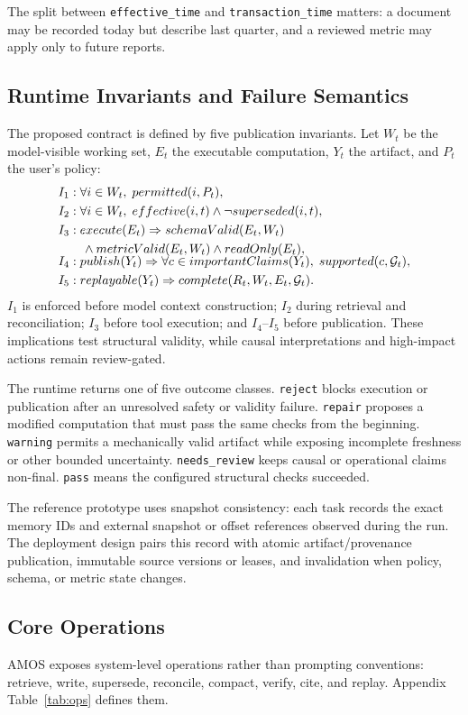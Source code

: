 \documentclass[sigconf,nonacm]{acmart}
\newcommand{\amos}{\textsc{AMOS}\xspace}
\newcommand{\prov}{\mathcal{G}}
\newcommand{\code}[1]{\texttt{#1}}
\begin{document}
The split between \code{effective\_time} and \code{transaction\_time} matters: a document may be recorded today but describe last quarter, and a reviewed metric may apply only to future reports.

\subsection{Runtime Invariants and Failure Semantics}
The proposed contract is defined by five publication invariants. Let $W_t$ be the model-visible working set, $E_t$ the executable computation, $Y_t$ the artifact, and $P_t$ the user's policy:
\begin{align}
I_1 &: \forall i \in W_t,\; permitted(i,P_t), \\
I_2 &: \forall i \in W_t,\; effective(i,t) \land \neg superseded(i,t), \\
I_3 &: execute(E_t) \Rightarrow schemaValid(E_t,W_t) \\
    &\quad \land metricValid(E_t,W_t) \land readOnly(E_t), \notag\\[-1.2ex]
I_4 &: publish(Y_t) \Rightarrow \forall c \in importantClaims(Y_t),\; supported(c,\prov_t), \\
I_5 &: replayable(Y_t) \Rightarrow complete(R_t,W_t,E_t,\prov_t).
\end{align}
$I_1$ is enforced before model context construction; $I_2$ during retrieval and reconciliation; $I_3$ before tool execution; and $I_4$--$I_5$ before publication. These implications test structural validity, while causal interpretations and high-impact actions remain review-gated.

The runtime returns one of five outcome classes. \code{reject} blocks execution or publication after an unresolved safety or validity failure. \code{repair} proposes a modified computation that must pass the same checks from the beginning. \code{warning} permits a mechanically valid artifact while exposing incomplete freshness or other bounded uncertainty. \code{needs\_review} keeps causal or operational claims non-final. \code{pass} means the configured structural checks succeeded.

The reference prototype uses snapshot consistency: each task records the exact memory IDs and external snapshot or offset references observed during the run. The deployment design pairs this record with atomic artifact/provenance publication, immutable source versions or leases, and invalidation when policy, schema, or metric state changes.

\subsection{Core Operations}
\amos exposes system-level operations rather than prompting conventions: retrieve, write, supersede, reconcile, compact, verify, cite, and replay. Appendix Table~\ref{tab:ops} defines them.
\end{document}
